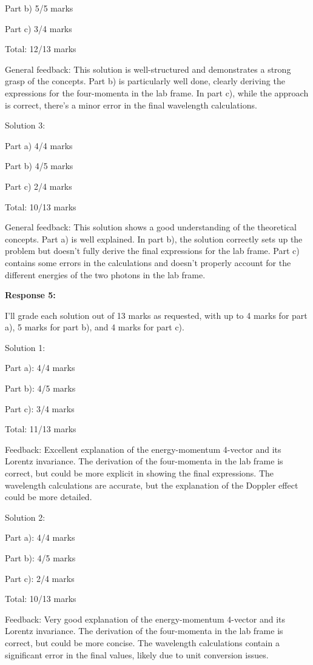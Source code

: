 \documentclass[a4paper,11pt]{article}
\begin{document}
Part b) 5/5 marks

Part c) 3/4 marks

Total: 12/13 marks

General feedback: This solution is well-structured and demonstrates a strong grasp of the concepts. Part b) is particularly well done, clearly deriving the expressions for the four-momenta in the lab frame. In part c), while the approach is correct, there's a minor error in the final wavelength calculations.

Solution 3:

Part a) 4/4 marks

Part b) 4/5 marks

Part c) 2/4 marks

Total: 10/13 marks

General feedback: This solution shows a good understanding of the theoretical concepts. Part a) is well explained. In part b), the solution correctly sets up the problem but doesn't fully derive the final expressions for the lab frame. Part c) contains some errors in the calculations and doesn't properly account for the different energies of the two photons in the lab frame.

\bigskip
\textbf{Response 5:}

I'll grade each solution out of 13 marks as requested, with up to 4 marks for part a), 5 marks for part b), and 4 marks for part c).

Solution 1:

Part a): 4/4 marks

Part b): 4/5 marks

Part c): 3/4 marks

Total: 11/13 marks

Feedback: Excellent explanation of the energy-momentum 4-vector and its Lorentz invariance. The derivation of the four-momenta in the lab frame is correct, but could be more explicit in showing the final expressions. The wavelength calculations are accurate, but the explanation of the Doppler effect could be more detailed.

Solution 2:

Part a): 4/4 marks

Part b): 4/5 marks

Part c): 2/4 marks

Total: 10/13 marks

Feedback: Very good explanation of the energy-momentum 4-vector and its Lorentz invariance. The derivation of the four-momenta in the lab frame is correct, but could be more concise. The wavelength calculations contain a significant error in the final values, likely due to unit conversion issues.
\end{document}

